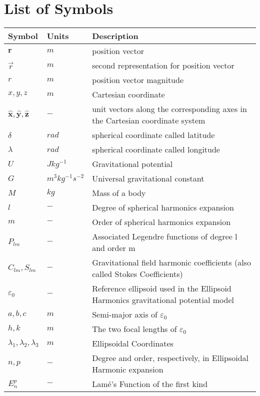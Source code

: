 \chapter*{List of Symbols}
\label{los}

\begin{longtable}[l]{p{100pt} p{70pt} p{250pt}}
\textbf{Symbol}	& \textbf{Units} & \textbf{Description} \\
\hline
\endhead
$\mathbf{r}$	& $m$		& position vector\\
$\overrightarrow{r}$	& $m$	& second representation for position vector\\
$r$				& $m$		& position vector magnitude\\
$x, y, z$		& $m$		& Cartesian coordinate\\
%
$\mathbf{\hat{x}}, \mathbf{\hat{y}}, \mathbf{\hat{z}}$		& $-$		& unit vectors along the corresponding axes in the Cartesian coordinate system\\
%
$\delta$	 & $rad$	  & spherical coordinate called latitude\\
$\lambda$	 & $rad$	  & spherical coordinate called longitude\\	
$U$			& $J kg^{-1}$		& Gravitational potential\\
$G$		& $m^3 kg^{-1} s^{-2}$		& Universal gravitational constant\\
$M$		& $kg$		& Mass of a body\\
$l$		& $-$		& Degree of spherical harmonics expansion\\
$m$		& $-$		& Order of spherical harmonics expansion\\
$P_{lm}$	& $-$	& Associated Legendre functions of degree l and order m\\
$C_{lm}, S_{lm}$	& $-$	& Gravitational field harmonic coefficients (also called Stokes Coefficients)\\
$\varepsilon_0$		& $-$		& Reference ellipsoid used in the Ellipsoid Harmonics gravitational potential model\\
$a, b, c$		& $m$		& Semi-major axis of $\varepsilon_0$\\
$h, k$		& $m$		& The two focal lengths of $\varepsilon_0$\\
$\lambda_1, \lambda_2, \lambda_3$		& $m$		& Ellipsoidal Coordinates\\
$n,p$		& $-$		& Degree and order, respectively, in Ellipsoidal Harmonic expansion\\
$E_n^p$		& $-$		& Lam\' e's Function of the first kind\\  

\end{longtable}
